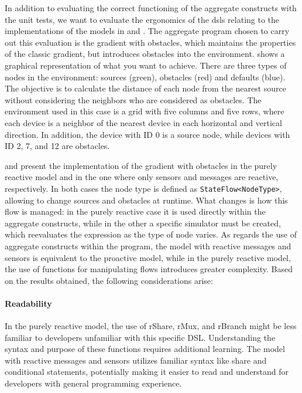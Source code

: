 In addition to evaluating the correct functioning of the aggregate constructs with the unit tests, we want to evaluate the ergonomics of the \acp{dsl} relating to the implementations of the models in  and . The aggregate program chosen to carry out this evaluation is the gradient with obstacles, which maintains the properties of the classic gradient, but introduces obstacles into the environment.  shows a graphical representation of what you want to achieve. There are three types of nodes in the environment: sources (green), obstacles (red) and defaults (blue). The objective is to calculate the distance of each node from the nearest source without considering the neighbors who are considered as obstacles. The environment used in this case is a grid with five columns and five rows, where each device is a neighbor of the nearest device in each horizontal and vertical direction. In addition, the device with ID 0 is a source node, while devices with ID 2, 7, and 12 are obstacles.

 and  present the implementation of the gradient with obstacles in the purely reactive model and in the one where only sensors and messages are reactive, respectively. In both cases the node type is defined as \texttt{StateFlow<NodeType>}, allowing to change sources and obstacles at runtime. What changes is how this flow is managed: in the purely reactive case it is used directly within the aggregate constructs, while in the other a specific simulator must be created, which reevaluates the expression as the type of node varies. As regards the use of aggregate constructs within the program, the model with reactive messages and sensors is equivalent to the proactive model, while in the purely reactive model, the use of functions for manipulating flows introduces greater complexity. Based on the results obtained, the following considerations arise:


\paragraph{Readability}

In the purely reactive model, the use of rShare, rMux, and rBranch might be less familiar to developers unfamiliar with this specific DSL. Understanding the syntax and purpose of these functions requires additional learning. The model with reactive messages and sensors utilizes familiar syntax like share and conditional statements, potentially making it easier to read and understand for developers with general programming experience.

